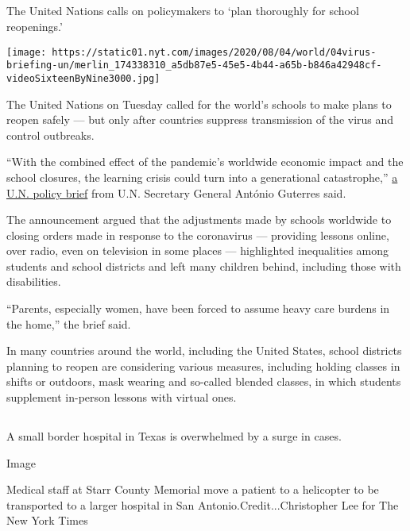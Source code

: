 \hypertarget{-4}{%
\subsection{}\label{-4}}

The United Nations calls on policymakers to `plan thoroughly for school
reopenings.'

\texttt{[image: https://static01.nyt.com/images/2020/08/04/world/04virus-briefing-un/merlin\_174338310\_a5db87e5-45e5-4b44-a65b-b846a42948cf-videoSixteenByNine3000.jpg]}

The United Nations on Tuesday called for the world's schools to make
plans to reopen safely --- but only after countries suppress
transmission of the virus and control outbreaks.

``With the combined effect of the pandemic's worldwide economic impact
and the school closures, the learning crisis could turn into a
generational catastrophe,''
\href{https://www.un.org/sites/un2.un.org/files/sg_policy_brief_covid-19_and_education_august_2020.pdf}{a
U.N. policy brief} from U.N. Secretary General António Guterres said.

The announcement argued that the adjustments made by schools worldwide
to closing orders made in response to the coronavirus --- providing
lessons online, over radio, even on television in some places ---
highlighted inequalities among students and school districts and left
many children behind, including those with disabilities.

``Parents, especially women, have been forced to assume heavy care
burdens in the home,'' the brief said.

In many countries around the world, including the United States, school
districts planning to reopen are considering various measures, including
holding classes in shifts or outdoors, mask wearing and so-called
blended classes, in which students supplement in-person lessons with
virtual ones.

\hypertarget{-5}{%
\subsection{}\label{-5}}

A small border hospital in Texas is overwhelmed by a surge in cases.

Image

Medical staff at Starr County Memorial move a patient to a helicopter to
be transported to a larger hospital in San Antonio.Credit...Christopher
Lee for The New York Times

